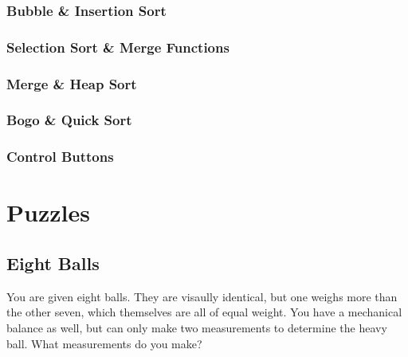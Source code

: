 \documentclass[12pt]{article}
\begin{document}
	\subsubsection{Bubble \& Insertion Sort}
	
	\pagebreak

	\subsubsection{Selection Sort \& Merge Functions}
	
	\pagebreak

	\subsubsection{Merge \& Heap Sort}
	

	
	\pagebreak

	\subsubsection{Bogo \& Quick Sort}
	
	\pagebreak

	\subsubsection{Control Buttons}
	
	\pagebreak

	\normalsize
	\section{Puzzles}
	\subsection{Eight Balls}
	You are given eight balls. They are visaully identical, but one weighs more than the other seven, which themselves are all of equal weight. You have a mechanical balance as well, but can only make two measurements to determine the heavy ball. What measurements do you make? \linebreak
\end{document}
